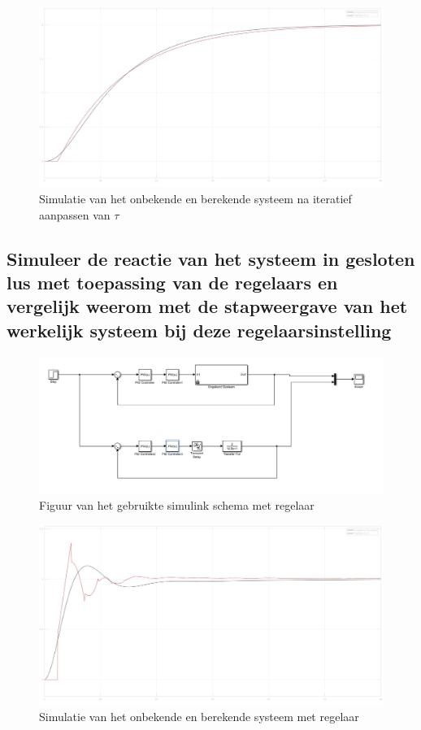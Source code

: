 \documentclass[a4paper, 12pt]{article}
\begin{document}
\begin{figure}[!h]
	\includegraphics[width=0.9\linewidth]{Labo1_3_scoop2.jpg}
	\caption{Simulatie van het onbekende en berekende systeem na iteratief aanpassen van $\tau$}
	\label{fig:scoop3.2}
\end{figure}

\newpage

\subsection{Simuleer de reactie van het systeem in gesloten lus met toepassing van de regelaars en vergelijk weerom met de stapweergave van het werkelijk systeem bij deze regelaarsinstelling}

\begin{figure}[!h]
	\includegraphics[width=1\linewidth]{Labo1_4_systeem.jpg}
	\caption{Figuur van het gebruikte simulink schema met regelaar}
\end{figure}

\begin{figure}[!h]
	\includegraphics[width=1\linewidth]{Labo1_4_scoop.jpg}
	\caption{Simulatie van het onbekende en berekende systeem met regelaar}
	\label{fig:scoop4.1}
\end{figure}
\end{document}
